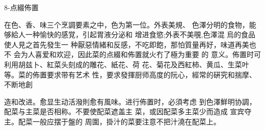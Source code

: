8-点綴佈置

在色、香、味三个烹調要素之中，色为第一位。外表美規、 色澤分明的食物，能够給人一种愉快的感覚，引起胃液分泌和 增进食慾;外表不美覗,色澤混
烏的食品使人見之首先發生一 种厭惡情緒和反感，不吃即飽，那怕質量再好，味道再美也不 会为人喜爱和欢迎，因此菜的点綴和佈置就火冇了極为重要
的 意义。佈置时可利用胡兹卜、紅菜头刻成的雕花、紙花、荷 花、菊花及西紅柿、黄瓜、生菜叶等。菜的佈置要求带有艺术 性，要求發揮厨师高度的阮心，經常的硏究和揣摩、不断地創


造和改进。愈显生动活潑則愈有風味。进行佈置时，必須考虑 到色澤鮮明协調，配菜与主菜是否相称。不要使配菜遮盖主 菜，或因配菜多主菜少而造成
宣宾夺主。配菜一般应摆于盤的 周圍，掛汁的菜要注意不把汁澆在配菜上。
